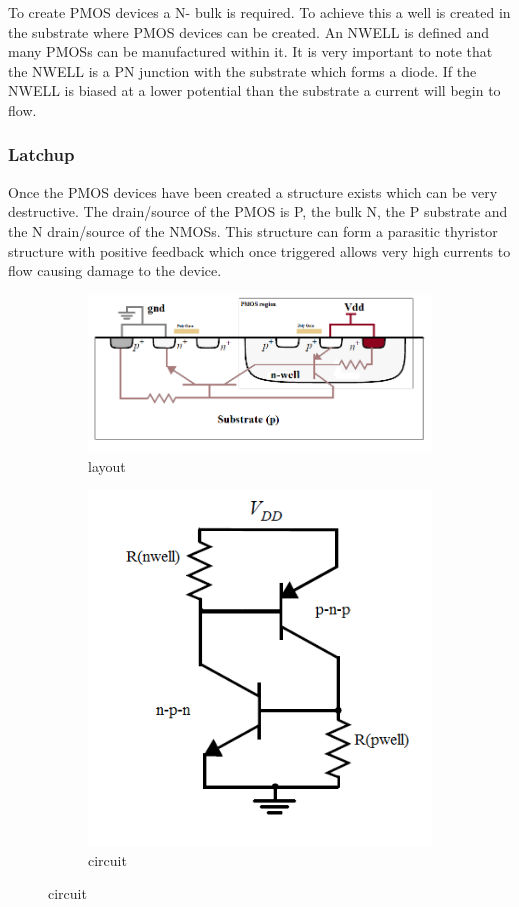 \documentclass[11pt]{article}
\begin{document}
To create PMOS devices a N- bulk is required. To achieve this a well is created in the substrate where PMOS devices can be created. An NWELL is defined and many PMOSs can be manufactured within it. It is very important to note that the NWELL is a PN junction with the substrate which forms a diode. If the NWELL is biased at a lower potential than the substrate a current will begin to flow.

\subsubsection{Latchup}

Once the PMOS devices have been created a structure exists which can be very destructive. The drain/source of the PMOS is P, the bulk N, the P substrate and the N drain/source of the NMOSs. This structure can form a parasitic thyristor structure with positive feedback which once triggered allows very high currents to flow causing damage to the device.


\begin{figure}[h]
\centering
\begin{subfigure}{0.6\textwidth}
  \centering
  \includegraphics[width=1.0\linewidth]{diagrams/latchup_layout.png}
  \caption{layout}
\end{subfigure}%
\begin{subfigure}{0.4\textwidth}
  \centering
  \includegraphics[width=0.6\linewidth]{diagrams/latchup_circuit.png}
  \caption{circuit}
\end{subfigure}
\end{figure}
\end{document}
